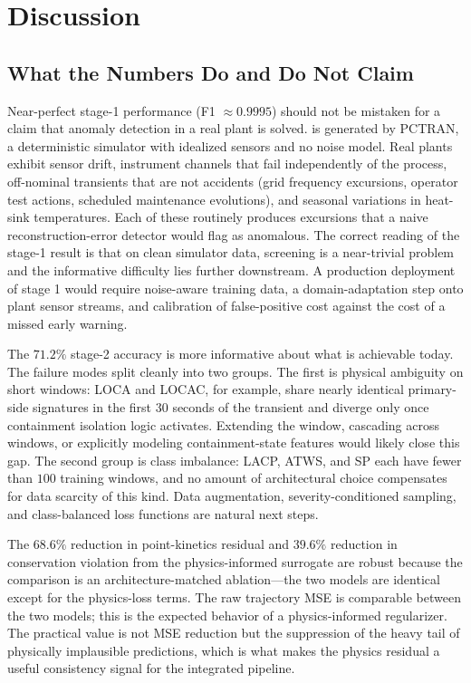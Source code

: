 \section{Discussion}
\label{sec:discussion}

\subsection{What the Numbers Do and Do Not Claim}

Near-perfect stage-1 performance (F1 $\approx 0.9995$) should not be mistaken for a claim that anomaly detection in a real plant is solved. \nppad{} is generated by PCTRAN, a deterministic simulator with idealized sensors and no noise model. Real plants exhibit sensor drift, instrument channels that fail independently of the process, off-nominal transients that are not accidents (grid frequency excursions, operator test actions, scheduled maintenance evolutions), and seasonal variations in heat-sink temperatures. Each of these routinely produces excursions that a naive reconstruction-error detector would flag as anomalous. The correct reading of the stage-1 result is that on clean simulator data, screening is a near-trivial problem and the informative difficulty lies further downstream. A production deployment of stage 1 would require noise-aware training data, a domain-adaptation step onto plant sensor streams, and calibration of false-positive cost against the cost of a missed early warning.

The $71.2\%$ stage-2 accuracy is more informative about what is achievable today. The failure modes split cleanly into two groups. The first is physical ambiguity on short windows: LOCA and LOCAC, for example, share nearly identical primary-side signatures in the first 30 seconds of the transient and diverge only once containment isolation logic activates. Extending the window, cascading across windows, or explicitly modeling containment-state features would likely close this gap. The second group is class imbalance: LACP, ATWS, and SP each have fewer than $100$ training windows, and no amount of architectural choice compensates for data scarcity of this kind. Data augmentation, severity-conditioned sampling, and class-balanced loss functions are natural next steps.

The $68.6\%$ reduction in point-kinetics residual and $39.6\%$ reduction in conservation violation from the physics-informed surrogate are robust because the comparison is an architecture-matched ablation---the two models are identical except for the physics-loss terms. The raw trajectory MSE is comparable between the two models; this is the expected behavior of a physics-informed regularizer. The practical value is not MSE reduction but the suppression of the heavy tail of physically implausible predictions, which is what makes the physics residual a useful consistency signal for the integrated pipeline.

